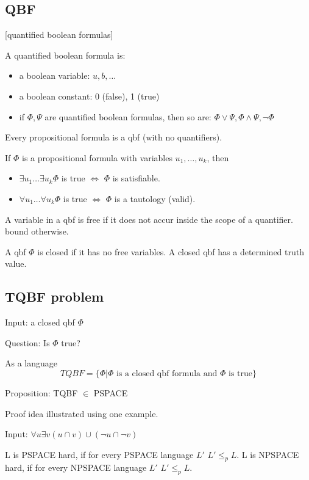 \documentclass[a4paper,12pt]{article}
\theoremstyle{definition}
\theoremstyle{remark}
\begin{document}
\subsection{QBF}[quantified boolean formulas]

A quantified boolean formula is:
\begin{itemize}
    \item a boolean variable: $u, b, \dots$
    \item a boolean constant: 0 (false), 1 (true)
    \item if $\Phi, \Psi$ are quantified boolean formulas, then so are: $\Phi \lor \Psi, \Phi \land \Psi, \neg \Phi$
\end{itemize}

Every propositional formula is a qbf (with no quantifiers).

If $\Phi$ is a propositional formula with variables $u_1, \dots, u_k$, then 
\begin{itemize}
    \item $\exists u_1 \dots \exists u_k \Phi$ is true $\iff$ $\Phi$ is satisfiable.
    \item $\forall u_1 \dots \forall u_k \Phi$ is true $\iff$ $\Phi$ is a tautology (valid).
\end{itemize}

A variable in a qbf is free if it does not accur inside the scope of a quantifier.
bound otherwise.

A qbf $\Phi$ is closed if it has no free variables.
A closed qbf has a determined truth value.

\subsection{TQBF problem}
Input: a closed qbf $\Phi$

Question: Is $\Phi$ true?

As a language
\begin{equation*}
    TQBF = \{\Phi | \Phi \text{ is a closed qbf formula and } \Phi \text{ is true}\}
\end{equation*}

Proposition: TQBF $\in$ PSPACE

Proof idea illustrated using one example.

Input: $\forall u \exists v (u \cap v) \cup (\neg u \cap \neg v)$

L is PSPACE hard, if for every PSPACE language $L'$ $L' \leq_p L$.
L is NPSPACE hard, if for every NPSPACE language $L'$ $L' \leq_p L$.
\end{document}
